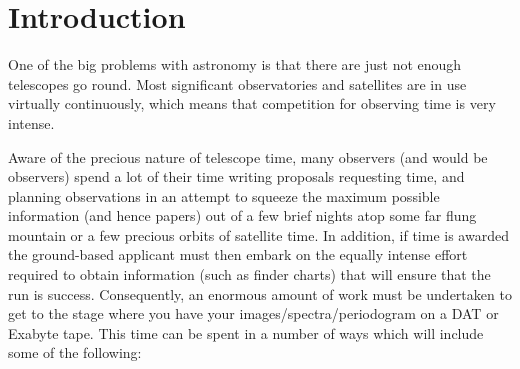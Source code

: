 
\stardocabstract
 \newpage
 \begin{latexonly}
   \setlength{\parskip}{0mm}
   \latexonlytoc
   \setlength{\parskip}{\medskipamount}
   \markboth{\stardocname}{\stardocname}
 \end{latexonly}
\cleardoublepage
\renewcommand{\thepage}{\arabic{page}}

\setcounter{page}{1}
 
\section{Introduction} 
\label{sec:introduction}

One of the big problems with astronomy is that there are just not enough
telescopes go round. Most significant observatories and satellites are in use
virtually continuously, which means that competition
for observing time is very intense. 

Aware of the precious nature of telescope time, many observers (and would be
observers) spend a lot of their time writing proposals requesting time, and
planning observations in an attempt to squeeze the maximum possible
information (and hence papers) out of a few brief nights atop some far flung
mountain or a few precious orbits of satellite time. In addition, if  
time is awarded the ground-based applicant must then embark on the equally 
intense effort required to obtain information (such as finder charts) that will
ensure that the run is success. Consequently, an enormous amount of work
must be undertaken to get to the stage where you have your 
images/spectra/periodogram on a DAT or Exabyte tape. This time can be spent in a number of
ways which will include some of the following:

